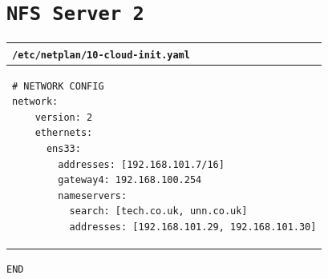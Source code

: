 \documentclass[11pt]{article}
\begin{document}
\section{\texttt{NFS Server 2}}
\begin{table}[ht]
    \begin{tabular}{|p{17.7cm}|} 
        \hline
    \texttt{\textbf{/etc/netplan/10-cloud-init.yaml}}\\ 
        \hline
        \lstset{
                basicstyle=\scriptsize\ttfamily,
        }
            \begin{lstlisting}
# NETWORK CONFIG
network:
    version: 2
    ethernets:
      ens33:
        addresses: [192.168.101.7/16]
        gateway4: 192.168.100.254
        nameservers:
          search: [tech.co.uk, unn.co.uk]
          addresses: [192.168.101.29, 192.168.101.30]
            \end{lstlisting}\\
        \hline
    \end{tabular}
\end{table}

\noindent \texttt{END}
\end{document}
